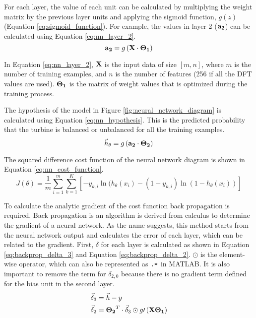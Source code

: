 For each layer, the value of each unit can be calculated by multiplying the weight matrix by the previous layer units and applying the sigmoid function, $g(z)$ (Equation \ref{eq:sigmoid_function}).  For example, the values in layer 2 ($\mathbf{a_2}$) can be calculated using Equation \ref{eq:nn_layer_2}.
\begin{equation} \label{eq:nn_layer_2}
	\mathbf{a_2} = g\left(\mathbf{X} \cdot \mathbf{\Theta_1}\right)
\end{equation}

In Equation \ref{eq:nn_layer_2}, $\mathbf{X}$ is the input data of size $[m,n]$, where $m$ is the number of training examples, and $n$ is the number of features (256 if all the DFT values are used).  $\mathbf{\Theta_1}$ is the matrix of weight values that is optimized during the training process.

The hypothesis of the model in Figure \ref{fig:neural_network_diagram} is calculated using Equation \ref{eq:nn_hypothesis}.  This is the predicted probability that the turbine is balanced or unbalanced for all the training examples.
\begin{equation} \label{eq:nn_hypothesis}
	\vec{h}_{\theta} = g\left(\mathbf{a_2} \cdot \mathbf{\Theta_2} \right)
\end{equation}

The squared difference cost function of the neural network diagram is shown in Equation \ref{eq:nn_cost_function}.
\begin{equation} \label{eq:nn_cost_function}
	J(\theta) = \frac{1}{m} \sum_{i=1}^{m}{\sum_{k=1}^{K}{\left[-y_{k,i} \ln{(h_{\theta}(x_i)} - (1-y_{k,i}) \ln{(1-h_{\theta}(x_i))} \right]}}
\end{equation}

To calculate the analytic gradient of the cost function back propagation is required.  Back propagation is an algorithm is derived from calculus to determine the gradient of a neural network.  As the name suggests, this method starts from the neural network output and calculates the error of each layer, which can be related to the gradient.  First, $\delta$ for each layer is calculated as shown in Equation \ref{eq:backprop_delta_3} and Equation \ref{eq:backprop_delta_2}.  $\odot$ is the element-wise operator, which can also be represented as $\texttt{.*}$ in MATLAB.  It is also important to remove the term for $\delta_{2,0}$ because there is no gradient term defined for the bias unit in the second layer.
\begin{align}
	\vec{\delta}_3 &= \vec{h} - y \label{eq:backprop_delta_3}\\
	\vec{\delta}_2 &= \mathbf{\Theta_2}^T \cdot \vec{\delta}_3 \odot g\prime \left(\mathbf{X} \mathbf{\Theta_1}\right) \label{eq:backprop_delta_2}
\end{align}

